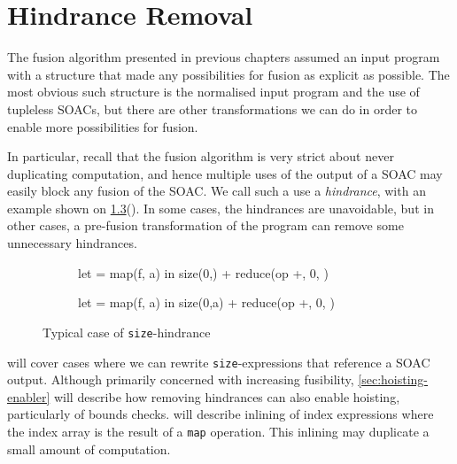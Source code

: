 \chapter{Hindrance Removal}
\label{chap:hindrance-removal}

The fusion algorithm presented in previous chapters assumed an input
program with a structure that made any possibilities for fusion as
explicit as possible.  The most obvious such structure is the
normalised input program and the use of tupleless SOACs, but there are
other transformations we can do in order to enable more possibilities
for fusion.

In particular, recall that the fusion algorithm is very strict about
never duplicating computation, and hence multiple uses of the output
of a SOAC may easily block any fusion of the SOAC.  We call such a use
a \textit{hindrance}, with an example shown on
\cref{fig:size-hindrance}().  In
some cases, the hindrances are unavoidable, but in other cases, a
pre-fusion transformation of the program can remove some unnecessary
hindrances.

\begin{figure}
\begin{subfigure}[t]{.5\textwidth}
\begin{colorcode}
let  = map(f, a) in
size(0,) + reduce(op +, 0, )
\end{colorcode}
\label{fig:size-hindrance-blocking}
\end{subfigure}%
\begin{subfigure}[t]{.5\textwidth}
\begin{colorcode}
let  = map(f, a) in
size(0,a) + reduce(op +, 0, )
\end{colorcode}
\label{fig:size-hindrance-removed}
\end{subfigure}%
\caption{Typical case of \texttt{size}-hindrance}
\label{fig:size-hindrance}
\end{figure}

 will cover cases where we can
rewrite \texttt{size}-expressions that reference a SOAC output.
Although primarily concerned with increasing fusibility,
\cref{sec:hoisting-enabler} will describe how removing hindrances can
also enable hoisting, particularly of bounds checks.
 will describe inlining of index
expressions where the index array is the result of a \texttt{map}
operation.  This inlining may duplicate a small amount of computation.

